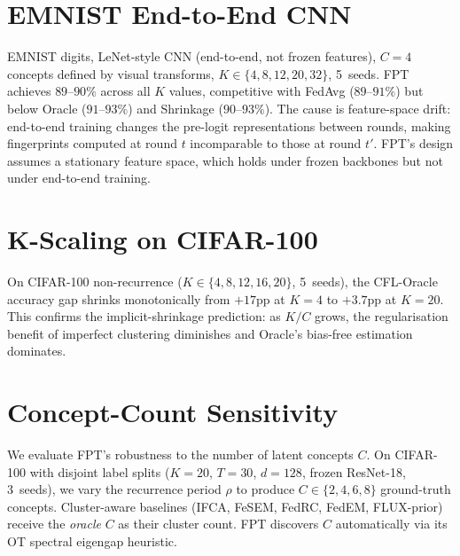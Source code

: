 \documentclass[11pt]{article}
\begin{document}
\section{EMNIST End-to-End CNN}
\label{app:emnist}

EMNIST digits, LeNet-style CNN (end-to-end, not frozen features), $C{=}4$ concepts defined by visual transforms, $K \in \{4, 8, 12, 20, 32\}$, 5~seeds.
FPT achieves $89$--$90\%$ across all $K$ values, competitive with FedAvg ($89$--$91\%$) but below Oracle ($91$--$93\%$) and Shrinkage ($90$--$93\%$).
The cause is feature-space drift: end-to-end training changes the pre-logit representations between rounds, making fingerprints computed at round $t$ incomparable to those at round $t'$.
FPT's design assumes a stationary feature space, which holds under frozen backbones but not under end-to-end training.


\section{K-Scaling on CIFAR-100}
\label{app:kscaling}

On CIFAR-100 non-recurrence ($K \in \{4,8,12,16,20\}$, 5~seeds), the CFL-Oracle accuracy gap shrinks monotonically from $+17$pp at $K{=}4$ to $+3.7$pp at $K{=}20$.
This confirms the implicit-shrinkage prediction: as $K/C$ grows, the regularisation benefit of imperfect clustering diminishes and Oracle's bias-free estimation dominates.


\section{Concept-Count Sensitivity}
\label{app:concept_count}

We evaluate FPT's robustness to the number of latent concepts $C$.
On CIFAR-100 with disjoint label splits ($K{=}20$, $T{=}30$, $d{=}128$, frozen ResNet-18, 3~seeds), we vary the recurrence period $\rho$ to produce $C \in \{2,4,6,8\}$ ground-truth concepts.
Cluster-aware baselines (IFCA, FeSEM, FedRC, FedEM, FLUX-prior) receive the \emph{oracle} $C$ as their cluster count.
FPT discovers $C$ automatically via its OT spectral eigengap heuristic.
\end{document}
